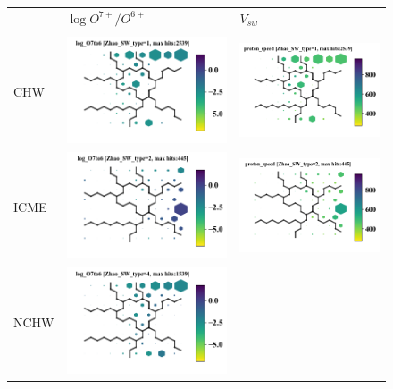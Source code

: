 \documentclass[utf8]{frontiersSCNS} %
\begin{document}
\begin{figure}[h!]\centering
	\begin{tabular}{m{1cm}CC}
		 & $\log O^{7+}/O^{6+}$ & $V_{sw}$ \\ \\
		CHW & \includegraphics[width=6cm]{Amaya/SWtype-Zhao_SW_type-1-log_O7to6} &
		\includegraphics[width=6cm]{Amaya/SWtype-Zhao_SW_type-1-proton_speed}\hfill	\\
		ICME & \includegraphics[width=6cm]{Amaya/SWtype-Zhao_SW_type-2-log_O7to6} &
		\includegraphics[width=6cm]{Amaya/SWtype-Zhao_SW_type-2-proton_speed}\hfill	\\
		NCHW & \includegraphics[width=6cm]{Amaya/SWtype-Zhao_SW_type-4-log_O7to6} &

\end{tabular}
\end{figure}
\end{document}
